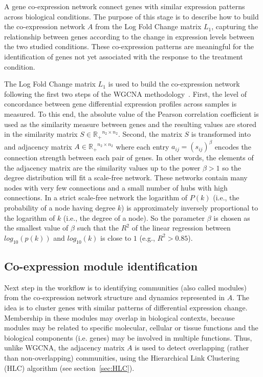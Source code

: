 A gene co-expression network connect genes with similar expression patterns across biological conditions. The purpose of this stage is to describe how to build the co-expression network $A$ from the Log Fold Change matrix $L_1$, capturing the relationship between genes according to the change in expression levels between the two studied conditions. These co-expression patterns are meaningful for the identification of genes not yet associated with the response to the treatment condition.

The Log Fold Change matrix $L_1$ is used to build the co-expression network following the first two steps of the WGCNA methodology~\cite{langfelder2008wgcna}. First, the level of concordance between gene differential expression profiles across samples is measured. To this end, the absolute value of the Pearson correlation coefficient is used as the similarity measure between genes and the resulting values are stored in the similarity matrix $S\in \mathbb{R_{+}}^{n_2 \times n_2}$. Second, the matrix $S$ is transformed into and adjacency matrix $A \in \mathbb{R_+}^{n_2\times n_2}$ where each entry $a_{ij} = (s_{ij})^\beta $ encodes the connection strength between each pair of genes. In other words, the elements of the adjacency matrix are the similarity values up to the power $\beta > 1$ so the degree distribution will fit a scale-free network. These networks contain many nodes with very few connections and a small number of hubs with high connections. In a strict scale-free network the logarithm of $P(k)$ (i.e., the probability of a node having degree $k$) is approximately inversely proportional to the logarithm of $k$ (i.e., the degree of a node). So the parameter $\beta$ is chosen as the smallest value of $\beta$ such that the $R^2$ of the linear regression between $log_{10}(p(k))$ and $log_{10}(k)$ is close to $1$ (e.g., $R^2 > 0.85$). 

\subsection{Co-expression module identification}

Next step in the workflow is to identifying communities (also called modules)
from the co-expression network structure and dynamics represented in $A$. 
The idea is to cluster genes with similar patterns of differential
expression change. Membership in these modules may overlap in 
biological contexts, because modules may be related to specific 
molecular, cellular or tissue functions and the biological components
(i.e. genes) may be involved in multiple functions. Thus, unlike WGCNA, the adjacency matrix $A$ is used to detect overlapping (rather than non-overlapping) communities, using the Hierarchical Link Clustering (HLC) algorithm (see section~\ref{sec:HLC}).

